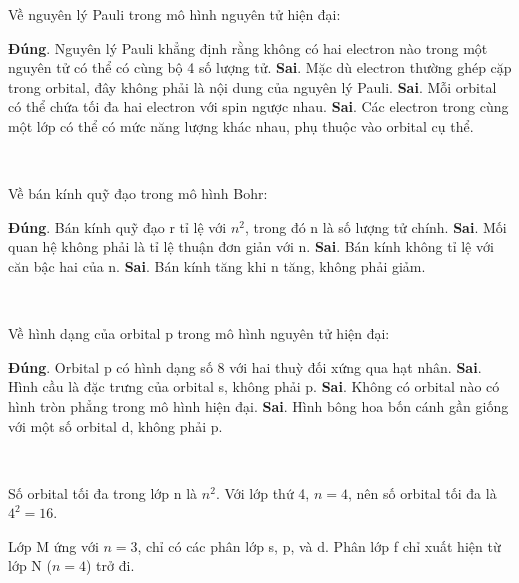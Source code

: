 \begin{loigiaiex}{6}
  Về nguyên lý Pauli trong mô hình nguyên tử hiện đại: \begin {itemchoice} \itemch \textbf {Đúng}. Nguyên lý Pauli khẳng định rằng không có hai electron nào trong một nguyên tử có thể có cùng bộ 4 số lượng tử. \itemch \textbf {Sai}. Mặc dù electron thường ghép cặp trong orbital, đây không phải là nội dung của nguyên lý Pauli. \itemch \textbf {Sai}. Mỗi orbital có thể chứa tối đa hai electron với spin ngược nhau. \itemch \textbf {Sai}. Các electron trong cùng một lớp có thể có mức năng lượng khác nhau, phụ thuộc vào orbital cụ thể. \end {itemchoice}  \phantom {a}\hfill { \faKey ~}
\end{loigiaiex}
\begin{loigiaiex}{7}
  Về bán kính quỹ đạo trong mô hình Bohr: \begin {itemchoice} \itemch \textbf {Đúng}. Bán kính quỹ đạo r tỉ lệ với $n^2$, trong đó n là số lượng tử chính. \itemch \textbf {Sai}. Mối quan hệ không phải là tỉ lệ thuận đơn giản với n. \itemch \textbf {Sai}. Bán kính không tỉ lệ với căn bậc hai của n. \itemch \textbf {Sai}. Bán kính tăng khi n tăng, không phải giảm. \end {itemchoice}  \phantom {a}\hfill { \faKey ~}
\end{loigiaiex}
\begin{loigiaiex}{8}
  Về hình dạng của orbital p trong mô hình nguyên tử hiện đại: \begin {itemchoice} \itemch \textbf {Đúng}. Orbital p có hình dạng số 8 với hai thuỳ đối xứng qua hạt nhân. \itemch \textbf {Sai}. Hình cầu là đặc trưng của orbital s, không phải p. \itemch \textbf {Sai}. Không có orbital nào có hình tròn phẳng trong mô hình hiện đại. \itemch \textbf {Sai}. Hình bông hoa bốn cánh gần giống với một số orbital d, không phải p. \end {itemchoice}  \phantom {a}\hfill { \faKey ~}
\end{loigiaiex}
\begin{loigiaiex}{9}
 Số orbital tối đa trong lớp n là $n^2$. Với lớp thứ 4, $n = 4$, nên số orbital tối đa là $4^2 = 16$. \phantom {a}\hfill { \faKey ~}
\end{loigiaiex}
\begin{loigiaiex}{10}
 Lớp M ứng với $n = 3$, chỉ có các phân lớp s, p, và d. Phân lớp f chỉ xuất hiện từ lớp N ($n = 4$) trở đi. \phantom {a}\hfill { \faKey ~}
\end{loigiaiex}
